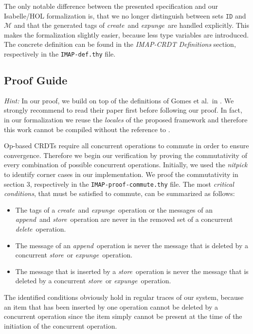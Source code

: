 \documentclass[11pt,a4paper, DIV=11]{article}
\newcommand{\create}{\textit{create}}
\newcommand{\delete}{\textit{delete}}
\newcommand{\store}{\textit{store}}
\newcommand{\append}{\textit{append}}
\newcommand{\expunge}{\textit{expunge}}
\begin{document}
The only notable difference between the presented specification and our Isabelle/HOL
formalization is, that we no longer distinguish between sets $\texttt{ID}$ and $\mathcal{M}$ and that the
generated tags of \create\ and \expunge\ are handled explicitly.
This makes the formalization slightly easier, because less type variables are
introduced. The concrete definition can be found in the \textit{IMAP-CRDT Definitions}
section, respectively in the \texttt{IMAP-def.thy} file.

\subsection{Proof Guide}

\textit{Hint:} In our proof, we build on top of the definitions of
Gomes et al.\ in \cite{gomes_crdtisabelle}.
We strongly recommend to read their paper first before following our proof.
In fact, in our formalization we reuse the \textit{locales} of the proposed framework
and therefore this work cannot be compiled without the reference to \cite{gomes_crdtafp}.

Op-based CRDTs require all concurrent operations to commute in order to ensure
convergence. Therefore we begin our verification by proving the commutativity of every
combination of possible concurrent operations.
Initially, we used the \textit{nitpick} to identify corner cases in our implementation.
We proof the commutativity in section 3, respectively in the \texttt{IMAP-proof-commute.thy} file.
The most \textit{critical conditions}, that must be satisfied to commute, can be
summarized as follows:
\begin{itemize}
  \item The tags of a \create\ and \expunge\ operation or the messages of an
  \append\ and \store\ operation are never in the removed set of a concurrent
  \delete\ operation.
  \item The message of an \append\ operation is never the message that is
  deleted by a concurrent \store\ or \expunge\ operation.
  \item The message that is inserted by a \store\ operation is never the message
  that is deleted by a concurrent \store\ or \expunge\ operation.
\end{itemize}

The identified conditions obviously hold in regular traces of our system,
because an item that has been inserted by one operation cannot be deleted by a
concurrent operation since the item simply cannot be present at the time of the
initiation of the concurrent operation.
\end{document}
